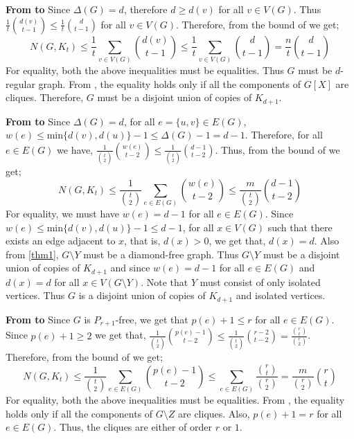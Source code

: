 \documentclass[pdflatex,sn-basic,Numbered]{sn-jnl}
\begin{document}
\vspace{2mm}

\noindent \textbf{From  to }
    \newline Since $\Delta(G) = d$, therefore $d \geq d(v)$ for all $v \in V(G)$. Thus $\frac{1}{t}{d(v)\choose t-1} \leq \frac{1}{t}{d\choose t-1}$ for all $v \in V(G)$. Therefore, from the bound of  we get;
    \begin{equation*}
        N(G,K_t) \leq \frac{1}{t}\sum_{v\in V(G)}{d(v) \choose t-1} \leq \frac{1}{t}\sum_{v \in V(G)}{d \choose t-1} = \frac{n}{t}{d\choose t-1}
    \end{equation*}
For equality, both the above inequalities must be equalities. Thus $G$ must be $d$-regular graph. From , the equality holds only if all the components of $G[X]$ are cliques. Therefore, $G$ must be a disjoint union of copies of $K_{d+1}$.

\vspace{2mm}


\noindent\textbf{From  to }
\newline Since $\Delta(G) =d$, for all $e = \{u,v\} \in E(G)$, $w(e) \leq  \text{min}\{d(v),d(u)\}-1\leq \Delta(G) -1 = d-1$. Therefore, for all $e \in E(G)$ we have, $\frac{1}{{t\choose 2}}{w(e)\choose t-2} \leq \frac{1}{{t\choose 2}}{d-1 \choose t-2}$. Thus, from the bound of  we get;
\begin{equation*}
    N(G,K_t) \leq \frac{1}{{t\choose 2}}\sum_{e\in E(G)}{w(e)\choose t-2} \leq  \frac{m}{{t\choose 2}}{d-1 \choose t-2}
\end{equation*}
For equality, we must have $w(e) = d-1$ for all $e \in E(G)$. Since $w(e) \leq  \text{min}\{d(v),d(u)\}-1\leq d-1$, for all $x \in V(G)$ such that there exists an edge adjacent to $x$, that is, $d(x) > 0$, we get that, $d(x) = d$. Also from \cref{thm1}, $G\setminus Y$ must be a diamond-free graph. Thus $G\setminus Y$ must be a disjoint union of copies of $K_{d+1}$ and since $w(e) = d-1$ for all $e \in E(G)$ and $d(x)=d$ for all $x \in V(G\setminus Y)$. Note that $Y$ must consist of only isolated vertices. Thus $G$ is a disjoint union of copies of $K_{d+1}$ and isolated vertices.
\vspace{2mm}


 \noindent\textbf{From  to }
\newline Since $G$ is $P_{r+1}$-free, we get that $p(e)+1 \leq r$ for all $e \in E(G)$. Since $p(e)+1 \geq 2$ we get that, $\frac{1}{{t\choose 2}}{p(e)-1\choose t-2} \leq \frac{1}{{t\choose 2}}{r-2\choose t-2} = \frac{{r\choose t}}{{r\choose 2}}$. Therefore, from the bound of  we get;
\begin{equation*}
    N(G,K_t) \leq \frac{1}{{t\choose 2}}\sum_{e\in E(G)}{p(e)-1\choose t-2} \leq  \sum_{e \in E(G)}\frac{{r\choose t}}{{r\choose 2}} = \frac{m}{{r\choose 2}}{r\choose t}
\end{equation*}
For equality, both the above inequalities must be equalities. From , the equality holds only if all the components of $G\setminus Z$ are cliques. Also, $p(e)+1 = r$ for all $e \in E(G)$. Thus, the cliques are either of order $r$ or $1$.
\end{document}
